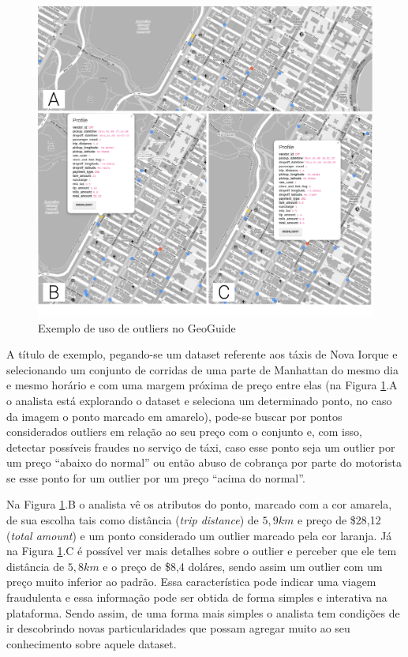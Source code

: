 \begin{figure}[t]
	\centering
	\includegraphics[width=\textwidth]{images/outliers-geoguide.png}
	\caption{Exemplo de uso de outliers no GeoGuide}
	\label{fig:outliers-geoguide}
	\vspace{-10pt}
\end{figure}

A título de exemplo, pegando-se um dataset referente aos táxis de Nova Iorque e selecionando um conjunto de corridas de uma parte de Manhattan do mesmo dia e mesmo horário e com uma margem próxima de preço entre elas (na Figura \ref{fig:outliers-geoguide}.A o analista está explorando o dataset e seleciona um determinado ponto, no caso da imagem o ponto marcado em amarelo), pode-se buscar por pontos considerados outliers em relação ao seu preço com o conjunto e, com isso, detectar possíveis fraudes no serviço de táxi, caso esse ponto seja um outlier por um preço ``abaixo do normal'' ou então abuso de cobrança por parte do motorista se esse ponto for um outlier por um preço ``acima do normal''.

Na Figura \ref{fig:outliers-geoguide}.B o analista vê os atributos do ponto, marcado com a cor amarela, de sua escolha tais como distância (\textit{trip distance}) de $5,9km$ e preço de \$28,12  (\textit{total amount}) e um ponto considerado um outlier marcado pela cor laranja. Já na Figura \ref{fig:outliers-geoguide}.C é possível ver mais detalhes sobre o outlier e perceber que ele tem distância de $5,8km$ e o preço de \$8,4 doláres, sendo assim um outlier com um preço muito inferior ao padrão. Essa característica pode indicar uma viagem fraudulenta e essa informação pode ser obtida de forma simples e interativa na plataforma. Sendo assim, de uma forma mais simples o analista tem condições de ir descobrindo novas particularidades que possam agregar muito ao seu conhecimento sobre aquele dataset.


